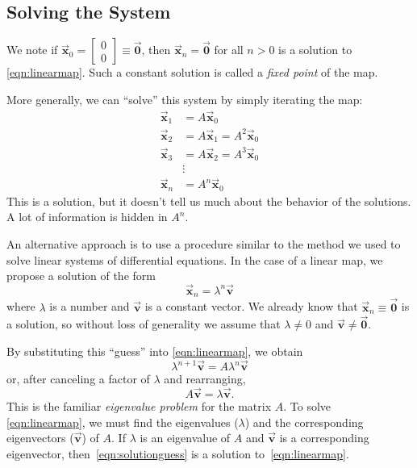 \documentclass[reqno]{immbook}
\newcommand{\BV}{\vec{\textbf{v}}}
\newcommand{\BX}{\vec{\textbf{x}}}
\newcommand{\BZ}{\vec{\textbf{0}}}  %
\begin{document}
\subsection*{Solving the System}
We note if $\BX_0 = \begin{bmatrix}0 \\ 0\end{bmatrix} \equiv \BZ$, then $\BX_n = \BZ$ for all $n>0$ is a solution to \eqref{eqn:linearmap}.
Such a constant solution is called a \emph{fixed point}
of the map.

More generally, we can ``solve'' this system by simply iterating the
map:
\begin{equation}
\begin{split}
  \BX_1 & = A\BX_0 \\
  \BX_2 & = A\BX_1 = A^2\BX_0 \\
  \BX_3 & = A\BX_2 = A^3\BX_0 \\
        & \vdots \\
  \BX_n & = A^n\BX_0
\end{split}
\end{equation}
This is a solution, but it doesn't tell us much about the
behavior of the solutions.  A lot of information is hidden
in $A^n$.

An alternative approach is to use a procedure similar to the
method we used to solve linear systems of differential equations.
In the case of a linear map, we propose a solution of the
form
\begin{equation}
   \BX_n = \lambda^n \BV
\label{eqn:solutionguess}
\end{equation}
where $\lambda$ is a number and $\BV$ is a constant vector.
We already know that $\BX_n\equiv\BZ$ is a solution, so without
loss of generality we assume that $\lambda\ne 0$ and
$\BV \ne \BZ$.

By substituting this ``guess'' into \eqref{eqn:linearmap},
we obtain
\begin{equation}
  \lambda^{n+1} \BV  = A\lambda^n\BV
\end{equation}
or, after canceling a factor of $\lambda$ and rearranging,
\begin{equation}
   A\BV = \lambda \BV.
\label{eqn:mapeigenvalueprob}
\end{equation}
This is the familiar \emph{eigenvalue problem}
for the matrix $A$.
To solve \eqref{eqn:linearmap}, we must find
the eigenvalues ($\lambda$) and
the corresponding eigenvectors ($\BV$) of $A$.
If $\lambda$ is an eigenvalue of $A$ and $\BV$ is a corresponding
eigenvector, then~\eqref{eqn:solutionguess} is a solution
to~\eqref{eqn:linearmap}.
\end{document}
